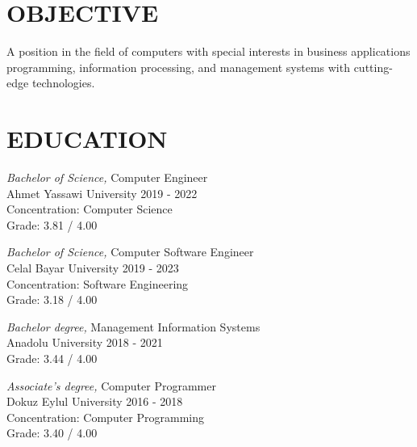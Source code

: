 \documentclass[line,margin]{res}
\begin{document}
\address{emre.yildiz.dev@hotmail.com}
\address{www.linkedin.com/in/emre-yildiz-297ab0242} 


 
\begin{resume}
 
\section{OBJECTIVE}       A position in the field of computers with special 
                interests in business applications programming, 
                information processing, and management systems with cutting-edge technologies. 
 
 
\section{EDUCATION} {\sl Bachelor of Science,} Computer Engineer \\
                Ahmet Yassawi University 
                2019 - 2022 \\
                Concentration: Computer Science \\
                Grade: 3.81 / 4.00 

                {\sl Bachelor of Science,} Computer Software Engineer \\
                Celal Bayar University 
                2019 - 2023 \\
                Concentration: Software Engineering \\
                Grade: 3.18 / 4.00 
                
                {\sl Bachelor degree,} Management Information Systems \\
                Anadolu University 
                2018 - 2021 \\
                Grade: 3.44 / 4.00 

                {\sl Associate's degree,} Computer Programmer \\
                Dokuz Eylul University 
                2016 - 2018 \\
                Concentration: Computer Programming \\
                Grade: 3.40 / 4.00 
 

\end{resume}
\end{document}
